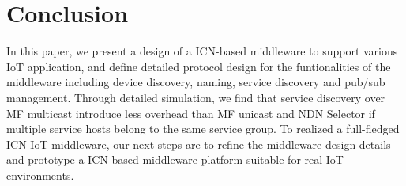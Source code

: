 \section{Conclusion}
In this paper, we present a design of a ICN-based middleware to support various IoT application, and define detailed protocol design for the funtionalities of the middleware including device discovery, naming, service discovery and pub/sub management. Through detailed simulation, we find that service discovery over MF multicast introduce less overhead than MF unicast and NDN Selector if multiple service hosts belong to the same service group. To realized a full-fledged ICN-IoT middleware, our next steps are to refine the middleware design details and prototype a ICN based middleware platform suitable for real IoT environments. 
